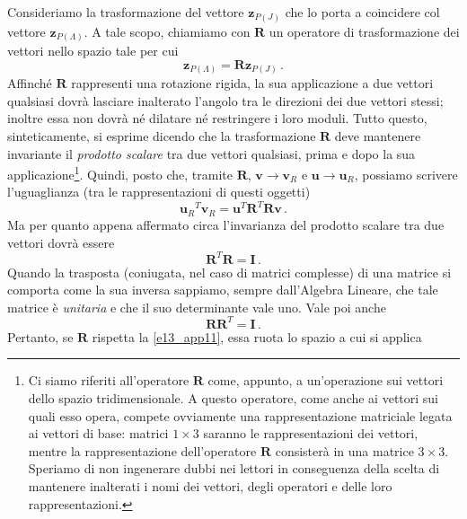 \noindent Consideriamo la trasformazione
del vettore 
${{\bm z}}_{\scriptscriptstyle{P(J)}}$ che lo porta a coincidere col vettore
${{\bm z}}_{\scriptscriptstyle{P(\Lambda)}}$.
A tale scopo, chiamiamo con $\bm R$ un operatore di trasformazione dei 
vettori nello spazio tale per cui 
\begin{equation}
{{\bm z}}_{\scriptscriptstyle{P(\Lambda)}}=
{\bm R}{\bm z}_{\scriptscriptstyle{P(J)}}\,.
\label{e11_app11}
\end{equation}
\noindent Affinch\'e $\bm{R}$ rappresenti una rotazione rigida, la sua applicazione a
due vettori qualsiasi dovr\`a 
lasciare inalterato l'angolo tra le direzioni dei due vettori stessi;
inoltre essa non dovr\`a n\'e dilatare
n\'e restringere i loro moduli. Tutto questo, sinteticamente, si esprime dicendo
che la trasformazione $\bm R$
 deve mantenere invariante il {\em prodotto scalare}
tra due vettori qualsiasi, prima e dopo la sua applicazione\footnote
{
Ci siamo riferiti all'operatore $\bm R$ come, appunto, a un'operazione
sui vettori dello spazio tridimensionale. A questo operatore, come anche
ai vettori sui quali esso opera, compete ovviamente
una rappresentazione matriciale
legata ai vettori di base: matrici $1\times3$ saranno le rappresentazioni dei vettori,
mentre la rappresentazione dell'operatore $\bm R$ consister\`a in una matrice
$3\times3$. Speriamo di non ingenerare dubbi nei lettori in conseguenza della
scelta di mantenere inalterati i nomi dei vettori, degli operatori e
delle loro rappresentazioni.
}.
Quindi, posto che, tramite $\bm{R}$,
 $\bm{v} \rightarrow {\bm{v}}_R$ e  $\bm{u} \rightarrow {\bm{u}}_R$,
possiamo scrivere l'uguaglianza (tra le rappresentazioni di questi oggetti)
\begin{equation}
{{\bm{u}}_R}^T{\bm{v}}_R={\bm{u}}^T{\bm{R}}^T{\bm{R}}{\bm{v}}\,.
\label{e12_app11}
\end{equation}
\noindent Ma per quanto appena affermato circa l'invarianza del prodotto scalare tra
due vettori dovr\`a essere
\begin{equation}
\bm{R}^T\bm{R}={\bm{I}}\,.
\label{e13_app11}
\end{equation}
\noindent Quando la trasposta (coniugata, nel caso di matrici complesse) di una matrice si comporta come la sua inversa
sappiamo, sempre dall'Algebra Lineare, che tale
matrice 
\`e {\em unitaria} e che il suo determinante vale uno. Vale poi anche
\begin{equation}
\bm{R}\bm{R}^T={\bm{I}}\,.
\label{e14_app11}
\end{equation}
\noindent Pertanto, se $\bm{R}$ rispetta la \ref{e13_app11}, essa ruota lo spazio a cui si applica
